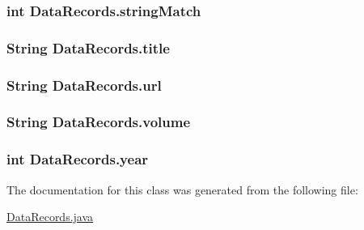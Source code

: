 \subsubsection[{\texorpdfstring{string\+Match}{stringMatch}}]{\setlength{\rightskip}{0pt plus 5cm}int Data\+Records.\+string\+Match\hspace{0.3cm}{\ttfamily [private]}}\hypertarget{classDataRecords_a45d9849a7089e7461c8e5568ee0cac20}{}\label{classDataRecords_a45d9849a7089e7461c8e5568ee0cac20}
\subsubsection[{\texorpdfstring{title}{title}}]{\setlength{\rightskip}{0pt plus 5cm}String Data\+Records.\+title\hspace{0.3cm}{\ttfamily [private]}}\hypertarget{classDataRecords_a0d2a944285b7168f1cc61f2173a3892b}{}\label{classDataRecords_a0d2a944285b7168f1cc61f2173a3892b}
\subsubsection[{\texorpdfstring{url}{url}}]{\setlength{\rightskip}{0pt plus 5cm}String Data\+Records.\+url\hspace{0.3cm}{\ttfamily [private]}}\hypertarget{classDataRecords_a220ad19762fcd3d7eb0c7da32a75ab39}{}\label{classDataRecords_a220ad19762fcd3d7eb0c7da32a75ab39}
\subsubsection[{\texorpdfstring{volume}{volume}}]{\setlength{\rightskip}{0pt plus 5cm}String Data\+Records.\+volume\hspace{0.3cm}{\ttfamily [private]}}\hypertarget{classDataRecords_a9def6bcb60fe42b44e052ebd5d499ac4}{}\label{classDataRecords_a9def6bcb60fe42b44e052ebd5d499ac4}
\subsubsection[{\texorpdfstring{year}{year}}]{\setlength{\rightskip}{0pt plus 5cm}int Data\+Records.\+year\hspace{0.3cm}{\ttfamily [private]}}\hypertarget{classDataRecords_ad7124e534dcce1adc70799071c64e431}{}\label{classDataRecords_ad7124e534dcce1adc70799071c64e431}


The documentation for this class was generated from the following file\+:\begin{DoxyCompactItemize}
\item 
\hyperlink{DataRecords_8java}{Data\+Records.\+java}\end{DoxyCompactItemize}
